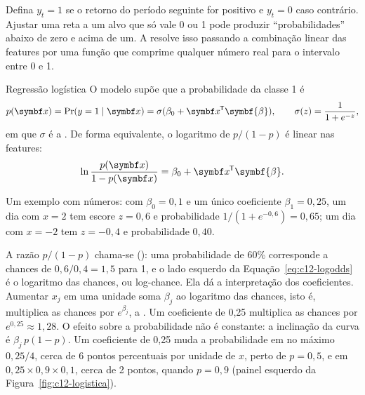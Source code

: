Defina $y_t = 1$ se o retorno do período seguinte for positivo e $y_t = 0$ caso contrário. Ajustar uma reta a um alvo que só vale 0 ou 1 pode produzir ``probabilidades'' abaixo de zero e acima de um. A  resolve isso passando a combinação linear das features por uma função que comprime qualquer número real para o intervalo entre 0 e 1.

\begin{definicao}{Regressão logística}
O modelo supõe que a probabilidade da classe 1 é
\begin{equation}
  p(\vetor{x}) = \Pr(y = 1 \mid \vetor{x}) = \sigma(\beta_0 + \vetor{x}\T\symbf{\beta}) ,
  \qquad \sigma(z) = \frac{1}{1 + e^{-z}} ,
  \label{eq:c12-logit}
\end{equation}
em que $\sigma$ é a . De forma equivalente, o logaritmo de $p/(1-p)$ é linear nas features:
\begin{equation}
  \ln \frac{p(\vetor{x})}{1 - p(\vetor{x})} = \beta_0 + \vetor{x}\T\symbf{\beta} .
  \label{eq:c12-logodds}
\end{equation}
\end{definicao}


Um exemplo com números: com $\beta_0 = 0,1$ e um único coeficiente $\beta_1 = 0,25$, um dia com $x = 2$ tem escore $z = 0,6$ e probabilidade $1/(1 + e^{-0,6}) = 0,65$; um dia com $x = -2$ tem $z = -0,4$ e probabilidade $0,40$.

A razão $p/(1-p)$ chama-se  (): uma probabilidade de 60\% corresponde a chances de $0,6/0,4 = 1,5$ para 1, e o lado esquerdo da Equação~\eqref{eq:c12-logodds} é o logaritmo das chances, ou log-chance. Ela dá a interpretação dos coeficientes. Aumentar $x_j$ em uma unidade soma $\beta_j$ ao logaritmo das chances, isto é, multiplica as chances por $e^{\beta_j}$, a . Um coeficiente de 0,25 multiplica as chances por $e^{0,25} \approx 1,28$. O efeito sobre a probabilidade não é constante: a inclinação da curva é $\beta_j\,p(1-p)$. Um coeficiente de 0,25 muda a probabilidade em no máximo $0,25/4$, cerca de 6 pontos percentuais por unidade de $x$, perto de $p = 0,5$, e em $0,25 \times 0,9 \times 0,1$, cerca de 2 pontos, quando $p = 0,9$ (painel esquerdo da Figura~\ref{fig:c12-logistica}).

